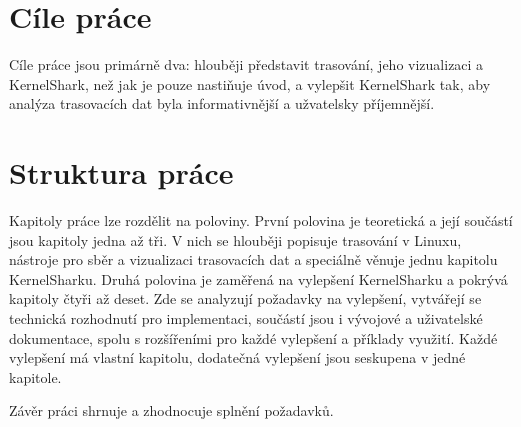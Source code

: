 \section*{Cíle práce}
Cíle práce jsou primárně dva: hlouběji představit trasování, jeho vizualizaci a KernelShark, než jak je pouze nastiňuje úvod, a vylepšit KernelShark tak, aby analýza trasovacích dat byla informativnější a užvatelsky příjemnější.

\section*{Struktura práce}
Kapitoly práce lze rozdělit na poloviny. První polovina je teoretická a její součástí jsou kapitoly jedna až tři. V nich se hlouběji popisuje trasování v Linuxu, nástroje pro sběr a vizualizaci trasovacích dat a speciálně věnuje jednu kapitolu KernelSharku. Druhá polovina je zaměřená na vylepšení KernelSharku a pokrývá kapitoly čtyři až deset. Zde se analyzují požadavky na vylepšení, vytvářejí se technická rozhodnutí pro implementaci, součástí jsou i vývojové a uživatelské dokumentace, spolu s rozšířeními pro každé vylepšení a příklady využití. Každé vylepšení má vlastní kapitolu, dodatečná vylepšení jsou seskupena v jedné kapitole.

Závěr práci shrnuje a zhodnocuje splnění požadavků.